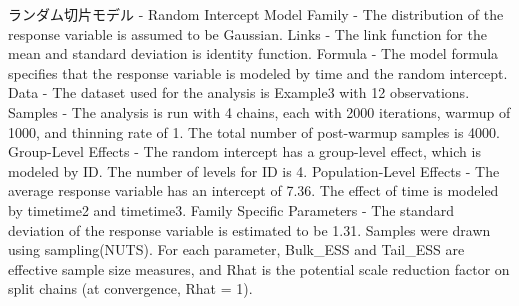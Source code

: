 ランダム切片モデル - Random Intercept Model
Family - The distribution of the response variable is assumed to be Gaussian.
Links - The link function for the mean and standard deviation is identity function.
Formula - The model formula specifies that the response variable is modeled by time and the random intercept.
Data - The dataset used for the analysis is Example3 with 12 observations.
Samples - The analysis is run with 4 chains, each with 2000 iterations, warmup of 1000, and thinning rate of 1. The total number of post-warmup samples is 4000.
Group-Level Effects - The random intercept has a group-level effect, which is modeled by ID. The number of levels for ID is 4.
Population-Level Effects - The average response variable has an intercept of 7.36. The effect of time is modeled by timetime2 and timetime3.
Family Specific Parameters - The standard deviation of the response variable is estimated to be 1.31.
Samples were drawn using sampling(NUTS). For each parameter, Bulk_ESS and Tail_ESS are effective sample size measures, and Rhat is the potential scale reduction factor on split chains (at convergence, Rhat = 1).
